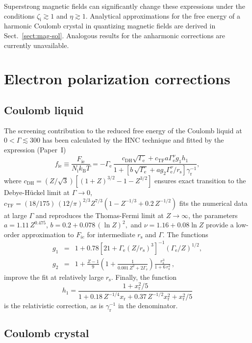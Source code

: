 \documentclass[traditabstract]{aa}
\newcommand{\beq}{\begin{equation}}
\newcommand{\eeq}{\end{equation}}
\newcommand{\bea}{\begin{eqnarray}}
\newcommand{\eea}{\end{eqnarray}}
\newcommand{\Gamme}{\Gamma_\mathrm{e}}
\newcommand{\gr}{\gamma_\mathrm{r}}
\newcommand{\Nion}{N_\mathrm{i}}
\newcommand{\kB}{k_\mathrm{B}}
\newcommand{\rs}{r_\mathrm{s}}
\newcommand{\xr}{x_\mathrm{r}}
\newcommand{\zeti}{\zeta_\mathrm{i}}
\begin{document}
Superstrong magnetic fields can significantly change these
expressions under the conditions $\zeti\gtrsim1$ and
$\eta\gtrsim1$. Analytical approximations for the free
energy of a harmonic Coulomb crystal in quantizing magnetic
fields are derived in Sect.~\ref{sect:mag-sol}. Analogous
results for the anharmonic corrections are currently
unavailable.

\section{Electron polarization corrections}
\label{sect:ei2}

\subsection{Coulomb liquid}
\label{sect:ei-liq}

The screening contribution to the reduced free energy of the
Coulomb liquid at $0<\Gamma\lesssim300$ has been calculated
by the HNC technique and fitted by the expression
(Paper~I)
\beq
  f_\mathrm{ie} \equiv \frac{F_\mathrm{ie} }{ \Nion \kB T}
   = -\Gamme \,
   \frac{ c_\mathrm{DH} \sqrt{\Gamme}+
    c_\mathrm{TF} a \Gamme^\nu g_1 h_1
    }{
     1+\left[ b\,\sqrt{\Gamme}+ a g_2 \Gamme^\nu/\rs \right]
    \gr^{-1} },
\label{fitscr}
\eeq
where 
$
   c_\mathrm{DH} = (Z/\sqrt{3})
    \left[(1+Z)^{3/2}-1-Z^{3/2}\right]
$
ensures exact transition to the Debye-H\"uckel limit at $\Gamma\to0$,
$c_\mathrm{TF} = 
   (18/175)\,(12/\pi)^{2/3} 
   Z^{7/3}\left(1-Z^{-1/3}+0.2\,Z^{-1/2}\right)
$
fits the numerical data at large $\Gamma$ and
reproduces the Thomas-Fermi limit \citep{Salpeter61} 
at $Z\to\infty$,
the parameters
$   a = 1.11 \, Z^{0.475}$,
$
   b = 0.2+0.078 \,(\ln Z)^2,
$ and
$
   \nu = 1.16 + 0.08 \ln Z
$
provide a low-order approximation to $F_{ie}$ for intermediate
$\rs$ and $\Gamma$. The functions
\bea
   g_1 &=& 1 + 0.78 \left[
           21+ \Gamme(Z/\rs)^3 \right]^{-1} (\Gamme/Z)^{1/2},
\nonumber\\
   g_2 &=& 1+\frac{ Z-1 }{ 9}
         \left(1+\frac{1}{0.001\, Z^2+2\Gamme}\right)
         \frac{\rs^3 }{ 1+ 6 \, \rs^{2} }\,,
\nonumber
\eea
improve the fit at relatively large $\rs$.
Finally, the function
\[
 h_1 = \frac{1+ \xr^2 / 5 }{ 1+0.18\,Z^{-1/4} \xr
 + 0.37\, Z^{-1/2} \xr^2 +\xr^2 /5}
\]
is the relativistic correction, as is $\gr^{-1}$
in the denominator.

\subsection{Coulomb crystal}
\label{sect:ei-sol}
\end{document}
